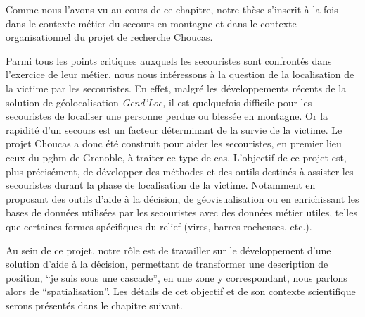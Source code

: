 Comme nous l'avons vu au cours de ce chapitre, notre thèse s'inscrit à
la fois dans le contexte métier du secours en montagne et dans
le contexte organisationnel du projet de recherche Choucas.

Parmi tous les points critiques auxquels les secouristes sont
confrontés dans l'exercice de leur métier, nous nous intéressons à la
question de la localisation de la victime par les secouristes. En
effet, malgré les développements récents de la solution de
géolocalisation \emph{Gend'Loc,} il est quelquefois difficile pour les
secouristes de localiser une personne perdue ou blessée en
montagne. Or la rapidité d'un secours est un facteur déterminant de la
survie de la victime. Le projet Choucas a donc été construit pour
aider les secouristes, en premier lieu ceux du \ac{pghm} de Grenoble,
à traiter ce type de cas. L'objectif de ce projet est, plus
précisément, de développer des méthodes et des outils destinés à
assister les secouristes durant la phase de localisation de la
victime. Notamment en proposant des outils d'aide à la décision, de
géovisualisation ou en enrichissant les bases de données utilisées par
les secouristes avec des données métier utiles, telles que certaines
formes spécifiques du relief (\eg vires, barres rocheuses, etc.).

Au sein de ce projet, notre rôle est de travailler sur le
développement d'une solution d'aide à la décision, permettant de
transformer une description de position, \eg \enquote{je suis sous une
  cascade}, en une zone y correspondant, nous parlons alors de
\enquote{spatialisation}. Les détails de cet objectif et de son
contexte scientifique serons présentés dans le chapitre suivant.

